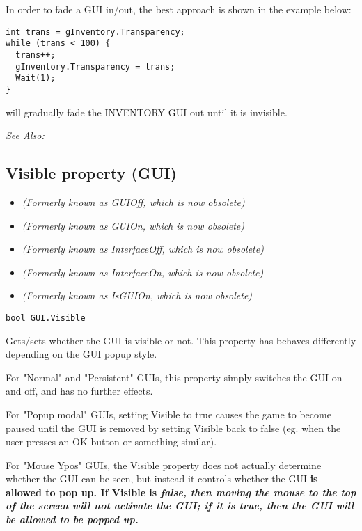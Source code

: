 In order to fade a GUI in/out, the best approach is shown in the example below:

\begin{verbatim}
int trans = gInventory.Transparency;
while (trans < 100) {
  trans++;
  gInventory.Transparency = trans;
  Wait(1);
}
\end{verbatim}
will gradually fade the INVENTORY GUI out until it is invisible.

\it{See Also:} 


\subsection{Visible property (GUI)}\label{GUI.Visible}%

\begin{itemize}
\item \it{(Formerly known as GUIOff, which is now obsolete)}
\item \it{(Formerly known as GUIOn, which is now obsolete)}
\item \it{(Formerly known as InterfaceOff, which is now obsolete)}
\item \it{(Formerly known as InterfaceOn, which is now obsolete)}
\item \it{(Formerly known as IsGUIOn, which is now obsolete)}
\end{itemize}

\begin{verbatim}
bool GUI.Visible
\end{verbatim}
Gets/sets whether the GUI is visible or not. This property has behaves
differently depending on the GUI popup style.

For "Normal" and "Persistent" GUIs, this property simply switches the GUI
on and off, and has no further effects.

For "Popup modal" GUIs, setting Visible to true causes the game to become paused
until the GUI is removed by setting Visible back to false (eg. when the user
presses an OK button or something similar).

For "Mouse Ypos" GUIs, the Visible property does not actually determine whether
the GUI can be seen, but instead it controls whether the GUI \bf{is allowed to} pop up.
If Visible is \it{false}, then moving the mouse to the top of the screen will not activate
the GUI; if it is \it{true}, then the GUI will be allowed to be popped up.

